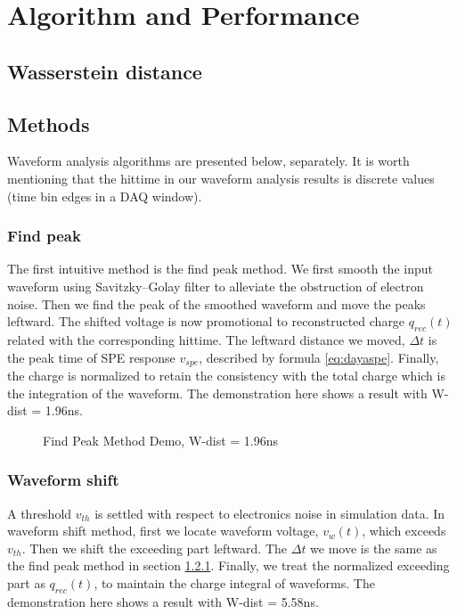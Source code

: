 \section{Algorithm and Performance} %
\label{sec:algorithm}

\subsection{Wasserstein distance}
\label{sec:W-dist}



\subsection{Methods}

Waveform analysis algorithms are presented below, separately. It is worth mentioning that the hittime in our waveform analysis results is discrete values (time bin edges in a DAQ window). 

\subsubsection{Find peak}
\label{sec:findpeak}

The first intuitive method is the find peak method. We first smooth the input waveform using Savitzky–Golay filter to alleviate the obstruction of electron noise. Then we find the peak of the smoothed waveform and move the peaks leftward. The shifted voltage is now promotional to reconstructed charge $q_{rec}(t)$ related with the corresponding hittime. The leftward distance we moved, $\Delta t$ is the peak time of SPE response $v_{spe}$, described by formula \eqref{eq:dayaspe}. Finally, the charge is normalized to retain the consistency with the total charge which is the integration of the waveform. The demonstration here shows a result with W-dist = 1.96ns. 

\begin{figure}[H]
    \centering
    \scalebox{0.4}{}
    \caption{Find Peak Method Demo, W-dist = 1.96ns}
\end{figure}

\subsubsection{Waveform shift}

A threshold $v_{th}$ is settled with respect to electronics noise in simulation data. In waveform shift method, first we locate waveform voltage, $v_{w}(t)$, which exceeds $v_{th}$. Then we shift the exceeding part leftward. The $\Delta t$ we move is the same as the find peak method in section \ref{sec:findpeak}. Finally, we treat the normalized exceeding part as $q_{rec}(t)$, to maintain the charge integral of waveforms. The demonstration here shows a result with W-dist = 5.58ns. 

